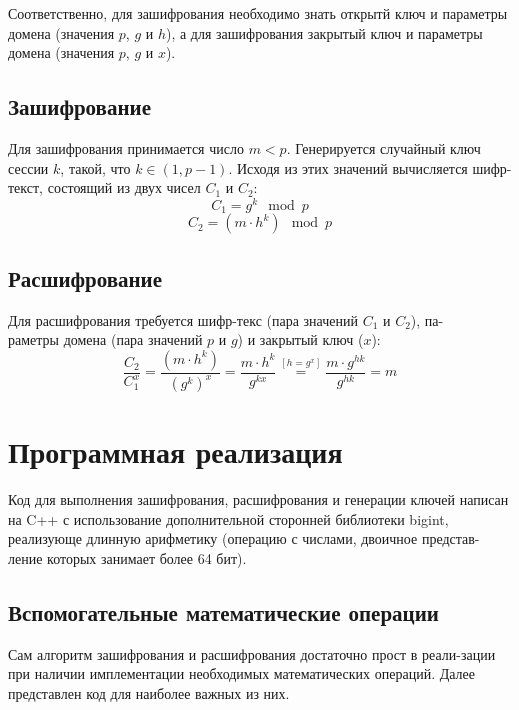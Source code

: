 \documentclass[a4paper]{article}
\begin{document}
  Соответственно, для зашифрования необходимо знать открытй ключ и параметры
  домена (значения $p$, $g$ и $h$), а для зашифрования закрытый ключ и параметры
  домена (значения $p$, $g$ и $x$).

  \subsection{Зашифрование}

  Для зашифрования принимается число $m < p$. Генерируется случайный ключ сессии $k$,
  такой, что $k \in \left(1, p - 1\right)$. Исходя из этих значений вычисляется шифр-текст,
  состоящий из двух чисел $C_1$ и $C_2$:
  \begin{equation}
    C_1 = g^k\mod{p}
  \end{equation}
  \begin{equation}
    C_2 = (m\cdot{h^k})\mod{p}
  \end{equation}

  \subsection{Расшифрование}

  Для расшифрования требуется шифр-текс (пара значений $C_1$ и $C_2$), па-\\раметры домена (пара значений $p$ и $g$) и 
  закрытый ключ ($x$):
  \begin{equation}
    \frac{C_2}{C_1^x} = \frac{(m\cdot{h^k})}{(g^k)^x} = \frac{m\cdot{h^k}}{g^{kx}}
    \overset{\left[h = g^x\right]}{=}
    \frac{m\cdot g^{hk}}{g^{hk}} = m
  \end{equation}

  \newpage
  \section{Программная реализация}

  Код для выполнения зашифрования, расшифрования и генерации ключей написан на C++ с использование
  дополнительной сторонней библиотеки bigint, реализующе длинную арифметику (операцию с числами, двоичное представ-\\ление
  которых занимает более 64 бит).

  \subsection{Вспомогательные математические операции}

  Сам алгоритм зашифрования и расшифрования достаточно прост в реали-зации при наличии
  имплементации необходимых математических операций. Далее представлен код для наиболее важных
  из них.
\end{document}
